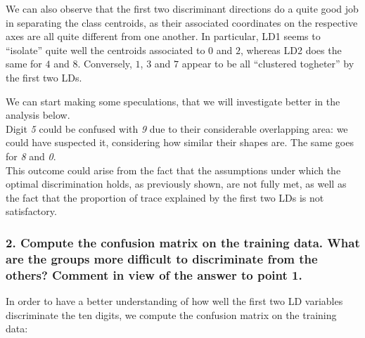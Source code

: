 \documentclass[
  letterpaper,
  DIV=11,
  numbers=noendperiod]{scrartcl}
\newenvironment{Shaded}{\begin{snugshade}}{\end{snugshade}}
\newcommand{\AttributeTok}[1]{\textcolor[rgb]{0.40,0.45,0.13}{#1}}
\newcommand{\FunctionTok}[1]{\textcolor[rgb]{0.28,0.35,0.67}{#1}}
\newcommand{\NormalTok}[1]{\textcolor[rgb]{0.00,0.23,0.31}{#1}}
\newcommand{\OtherTok}[1]{\textcolor[rgb]{0.00,0.23,0.31}{#1}}
\newcommand{\SpecialCharTok}[1]{\textcolor[rgb]{0.37,0.37,0.37}{#1}}
\begin{document}
We can also observe that the first two discriminant directions do a
quite good job in separating the class centroids, as their associated
coordinates on the respective axes are all quite different from one
another. In particular, LD1 seems to ``isolate'' quite well the
centroids associated to \(0\) and \(2\), whereas LD2 does the same for
\(4\) and \(8\). Conversely, \(1\), \(3\) and \(7\) appear to be all
``clustered togheter'' by the first two LDs.

We can start making some speculations, that we will investigate better
in the analysis below.\\
Digit \emph{5} could be confused with \emph{9} due to their considerable
overlapping area: we could have suspected it, considering how similar
their shapes are. The same goes for \emph{8} and \emph{0}.\\
This outcome could arise from the fact that the assumptions under which
the optimal discrimination holds, as previously shown, are not fully
met, as well as the fact that the proportion of trace explained by the
first two LDs is not satisfactory.

\hypertarget{compute-the-confusion-matrix-on-the-training-data.-what-are-the-groups-more-difficult-to-discriminate-from-the-others-comment-in-view-of-the-answer-to-point-1.}{%
\subsubsection{2. Compute the confusion matrix on the training data.
What are the groups more difficult to discriminate from the others?
Comment in view of the answer to point
1.}\label{compute-the-confusion-matrix-on-the-training-data.-what-are-the-groups-more-difficult-to-discriminate-from-the-others-comment-in-view-of-the-answer-to-point-1.}}

In order to have a better understanding of how well the first two LD
variables discriminate the ten digits, we compute the confusion matrix
on the training data:

\begin{Shaded}
\end{Shaded}
\end{document}
